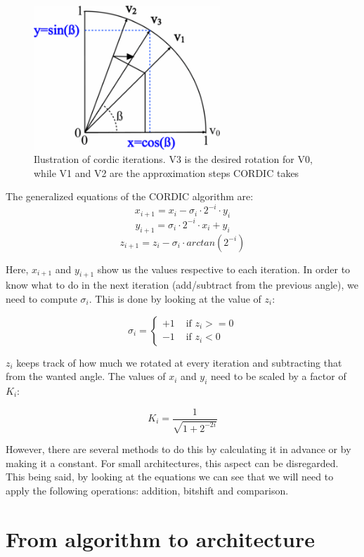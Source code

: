 \documentclass[12pt, a4paper,oneside]{article}
\begin{document}
\begin{figure}[H]
	\centering
	\includegraphics[width = 7cm]{cordic_iterations.png}
	\caption{Ilustration of cordic iterations. V3 is the desired rotation for V0,
	while V1 and V2 are the approximation steps CORDIC takes\cite{cordic2}}
	\label{fig:cordic_iterations}
\end{figure}

The generalized equations of the CORDIC algorithm are:
\[ x_{i+1} = x_i - \sigma_i \cdot 2^{-i} \cdot y_i \]
\[ y_{i+1} = \sigma_i \cdot 2^{-i} \cdot x_i + y_i\]
\[ z_{i+1} = z_i - \sigma_i \cdot arctan(2^{-i}) \]


Here, $x_{i+1}$ and $y_{i+1}$ show us the values respective to each iteration.
In order to know what to do in the next iteration (add/subtract from the previous
angle), we need to compute $\sigma_i$. This is done by looking at the value of 
$z_i$:

$$
\sigma_i = \left\{ \begin{array}{rl}
 +1 &\mbox{ if $z_i>=0$} \\
 -1 &\mbox{ if $z_i<0$}
       \end{array} \right.
$$

$z_i$ keeps track of how much we rotated at every iteration and subtracting that 
from the wanted angle.
The values of $x_i$ and $y_i$ need to be scaled by a factor of $K_i$:

$$K_i = \frac{1}{\sqrt{1 + 2^{-2i}}}$$

However, there are several methods to do this by calculating it in advance or by 
making it a constant. For small architectures, this aspect can be disregarded.
\\
This being said, by looking at the equations we can see that we will need 
to apply the following operations: addition, bitshift and comparison.

\section{From algorithm to architecture}
\end{document}
